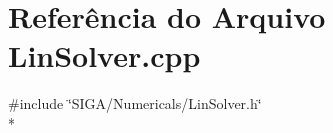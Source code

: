 \section{Referência do Arquivo Lin\+Solver.\+cpp}
\label{_lin_solver_8cpp}
{\ttfamily \#include \char`\"{}S\+I\+G\+A/\+Numericals/\+Lin\+Solver.\+h\char`\"{}}\\*
